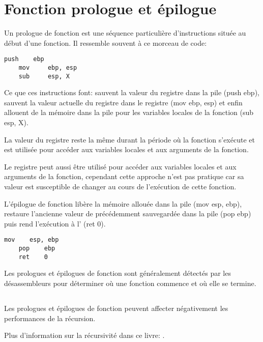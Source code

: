 \section{Fonction prologue et épilogue}
\label{sec:prologepilog}

Un prologue de fonction est une séquence particulière d'instructions située au début d'une fonction. Il ressemble souvent à ce morceau de code:

\begin{lstlisting}[style=customasmx86]
    push    ebp
    mov     ebp, esp
    sub     esp, X
\end{lstlisting}

Ce que ces instructions font: sauvent la valeur du registre \EBP dans la pile (push ebp), sauvent la valeur actuelle du registre \ESP dans le
 registre \EBP (mov ebp, esp) et enfin allouent de la mémoire dans la pile pour les variables locales de la fonction (sub esp, X).

La valeur du registre \EBP reste la même durant la période où la fonction s'exécute et est utilisée pour accéder aux variables locales et aux arguments de la fonction.

Le registre \ESP peut aussi être utilisé pour accéder aux variables locales et aux arguments de la fonction, cependant cette approche n'est
 pas pratique car sa valeur est susceptible de changer au cours de l'exécution de cette fonction.

L'épilogue de fonction libère la mémoire allouée dans la pile (mov esp, ebp), restaure l'ancienne valeur de \EBP précédemment sauvegardée dans la pile (pop ebp) puis rend l'exécution à l' (ret 0).

\begin{lstlisting}[style=customasmx86]
    mov    esp, ebp
    pop    ebp
    ret    0
\end{lstlisting}

Les prologues et épilogues de fonction sont généralement détectés par les désassembleurs pour déterminer où une fonction commence et où elle se termine.

\subsection{\Recursion}

\myindex{\Recursion}
Les prologues et épilogues de fonction peuvent affecter négativement les performances de la récursion.

Plus d'information sur la récursivité dans ce livre: .

